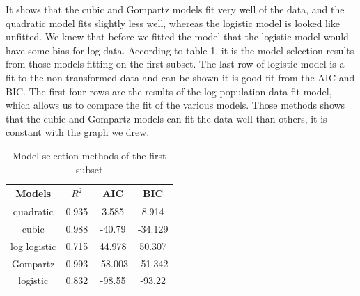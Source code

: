 \documentclass[11pt]{article}
\begin{document}
It shows that the cubic and Gompartz models fit very well of the data, and the quadratic model fits slightly less well, whereas the logistic model is looked like unfitted. We knew that before we fitted the model that the logistic model would have some bias for log data. According to table 1, it is the model selection results from those models fitting on the first subset. The last row of logistic model is a fit to the non-transformed data and can be shown it is good fit from the AIC and BIC. The first four rows are the results of the log population data fit model, which allows us to compare the fit of the various models. Those methods shows that the cubic and Gompartz models can fit the data well than others, it is constant with the graph we drew.
\begin{table}[!h]
    \centering
    \begin{tabular}{c|c|c|c}
    \hline
        Models&\(R^2\)&AIC&BIC\\
        \hline
        quadratic & 0.935&3.585&8.914 \\
         cubic& 0.988&-40.79&-34.129\\
         log logistic&0.715&44.978&50.307\\
         Gompartz&0.993&-58.003&-51.342\\
         logistic&0.832&-98.55&-93.22\\
         \hline
         
    \end{tabular}
    \caption{Model selection methods of the first subset}
    \label{tab:my_label}
\end{table}
\end{document}
